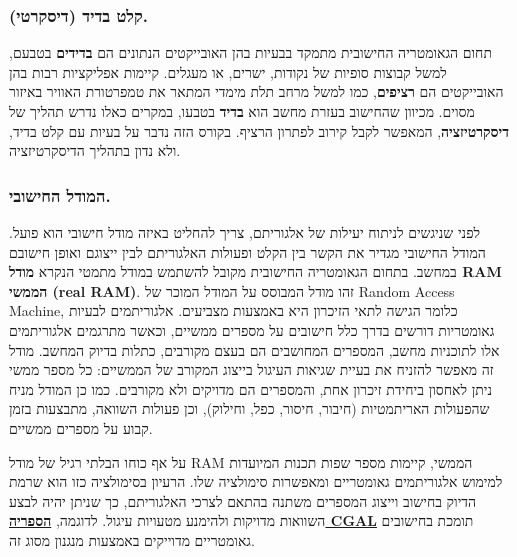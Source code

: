 \documentclass[
]{book}
\begin{document}
\hypertarget{ux5e7ux5dcux5d8-ux5d1ux5d3ux5d9ux5d3-ux5d3ux5d9ux5e1ux5e7ux5e8ux5d8ux5d9.}{%
\subsubsection*{קלט בדיד (דיסקרטי).}\label{ux5e7ux5dcux5d8-ux5d1ux5d3ux5d9ux5d3-ux5d3ux5d9ux5e1ux5e7ux5e8ux5d8ux5d9.}}

תחום הגאומטריה החישובית מתמקד בבעיות בהן האובייקטים הנתונים הם \textbf{בדידים} בטבעם, למשל קבוצות סופיות של נקודות, ישרים, או מעגלים. קיימות אפליקציות רבות בהן האובייקטים הם \textbf{רציפים}, כמו למשל מרחב תלת מימדי המתאר את טמפרטורת האוויר באיזור מסוים. מכיוון שהחישוב בעזרת מחשב הוא \textbf{בדיד} בטבעו, במקרים כאלו נדרש תהליך של \textbf{דיסקרטיזציה}, המאפשר לקבל קירוב לפתרון הרציף. בקורס הזה נדבר על בעיות עם קלט בדיד, ולא נדון בתהליך הדיסקרטיזציה.

\hypertarget{ux5d4ux5deux5d5ux5d3ux5dc-ux5d4ux5d7ux5d9ux5e9ux5d5ux5d1ux5d9.}{%
\subsubsection*{המודל החישובי.}\label{ux5d4ux5deux5d5ux5d3ux5dc-ux5d4ux5d7ux5d9ux5e9ux5d5ux5d1ux5d9.}}

לפני שניגשים לניתוח יעילות של אלגוריתם, צריך להחליט באיזה מודל חישובי הוא פועל. המודל החישובי מגדיר את הקשר בין הקלט ופעולות האלגוריתם לבין ייצוגם ואופן חישובם במחשב. בתחום הגאומטריה החישובית מקובל להשתמש במודל מתמטי הנקרא \textbf{מודל RAM הממשי (real RAM)}. זהו מודל המבוסס על המודל המוכר של Random Access Machine, כלומר הגישה לתאי הזיכרון היא באמצעות מצביעים. אלגוריתמים לבעיות גאומטריות דורשים בדרך כלל חישובים על מספרים ממשיים, וכאשר מתרגמים אלגוריתמים אלו לתוכניות מחשב, המספרים המחושבים הם בעצם מקורבים, כתלות בדיוק המחשב. מודל זה מאפשר להזניח את בעיית שגיאות העיגול בייצוג המקורב של הממשיים: כל מספר ממשי ניתן לאחסון ביחידת זיכרון אחת, והמספרים הם מדויקים ולא מקורבים. כמו כן המודל מניח שהפעולות האריתמטיות (חיבור, חיסור, כפל, וחילוק), וכן פעולות השוואה, מתבצעות בזמן קבוע על מספרים ממשיים.

על אף כוחו הבלתי רגיל של מודל RAM הממשי, קיימות מספר שפות תכנות המיועדות למימוש אלגוריתמים גאומטריים ומאפשרות סימולציה שלו. הרעיון בסימולציה כזו הוא שרמת הדיוק בחישוב וייצוג המספרים משתנה בהתאם לצרכי האלגוריתם, כך שניתן יהיה לבצע השוואות מדויקות ולהימנע מטעויות עיגול. לדוגמה, \href{https://www.cgal.org/}{\textbf{הספריה CGAL}} תומכת בחישובים גאומטריים מדוייקים באמצעות מנגנון מסוג זה.
\end{document}
